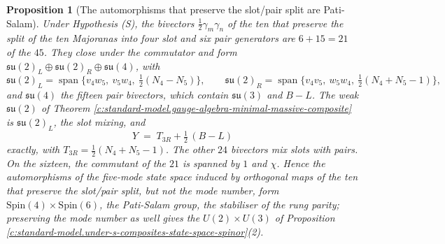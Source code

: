 \documentclass[11pt]{article}
\newtheorem{proposition}[theorem]{Proposition}
\theoremstyle{definition}
\theoremstyle{plain}
\newcommand{\changedmark}[2]{\marginpar{\raggedright\scriptsize\color{#1}#2}}
\providecommand{\su}{}\renewcommand{\su}{\mathfrak{su}}
\begin{document}
\begin{proposition}[The automorphisms that preserve the slot/pair split are Pati-Salam]\label{c:standard-model.automorphisms-preserve-slot-pair-split-are}
\changedmark{gray}{reworded}
Under Hypothesis (S), the bivectors $\tfrac12\gamma_{m}\gamma_{n}$ of the ten that preserve the split of the ten Majoranas into four slot and six pair generators are $6 + 15 = 21$ of the $45$. They close under the commutator and form $\su(2)_{L} \oplus \su(2)_{R} \oplus \su(4)$, with
\[
\su(2)_{L} = \operatorname{span}\bigl\{v_{4}w_{5},\ v_{5}w_{4},\ \tfrac12(N_{4} - N_{5})\bigr\}, \qquad
\su(2)_{R} = \operatorname{span}\bigl\{v_{4}v_{5},\ w_{5}w_{4},\ \tfrac12(N_{4} + N_{5} - 1)\bigr\},
\]
and $\su(4)$ the fifteen pair bivectors, which contain $\su(3)$ and $B - L$. The weak $\su(2)$ of Theorem \ref{c:standard-model.gauge-algebra-minimal-massive-composite} is $\su(2)_{L}$, the slot mixing, and
\[
Y \;=\; T_{3R} + \tfrac12\,(B - L)
\]
exactly, with $T_{3R} = \tfrac12(N_{4} + N_{5} - 1)$. The other $24$ bivectors mix slots with pairs. On the sixteen, the commutant of the $21$ is spanned by $1$ and $\chi$. Hence the automorphisms of the five-mode state space induced by orthogonal maps of the ten that preserve the slot/pair split, but not the mode number, form $\mathrm{Spin}(4) \times \mathrm{Spin}(6)$, the Pati-Salam group, the stabiliser of the rung parity; preserving the mode number as well gives the $U(2) \times U(3)$ of Proposition \ref{c:standard-model.under-s-composites-state-space-spinor}(2).
\end{proposition}
\end{document}
